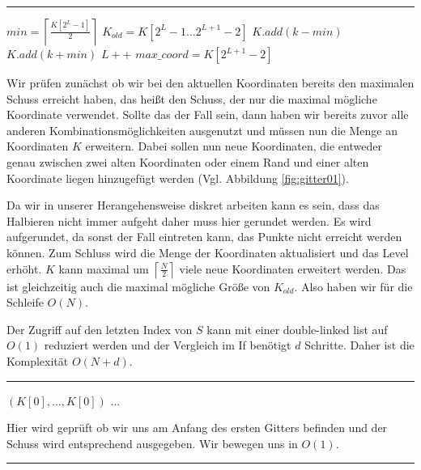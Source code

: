 \documentclass[a4paper,12pt]{llncs}
\numberwithin{equation}{section}
\begin{document}
\smallskip
\hrule
\smallskip
\begin{tcolorbox}
	\begin{algorithmic}
		\State $min=\left\lceil\frac{K[2^L-1]}{2}\right\rceil$
		\State $K_{old}=K\left[2^L-1\dots 2^{L+1}-2\right]$
		\State $K.add(k-min)$
		\State $K.add(k+min)$
		\EndFor
		\State $L++$
		\State $max\_coord=K\left[2^{L+1}-2\right]$
		\EndIf
	\end{algorithmic}
\end{tcolorbox}
Wir prüfen zunächst ob wir bei den aktuellen Koordinaten bereits den maximalen Schuss erreicht haben, das heißt den Schuss, der nur die maximal mögliche Koordinate verwendet. Sollte das der Fall sein, dann haben wir bereits zuvor alle anderen Kombinationsmöglichkeiten ausgenutzt und müssen nun die Menge an Koordinaten $K$ erweitern. Dabei sollen nun neue Koordinaten, die entweder genau zwischen zwei alten Koordinaten oder einem Rand und einer alten Koordinate liegen hinzugefügt werden (Vgl. Abbildung \ref{fig:gitter01}). 

Da wir in unserer Herangehensweise diskret arbeiten kann es sein, dass das Halbieren nicht immer aufgeht daher muss hier gerundet werden. Es wird aufgerundet, da sonst der Fall eintreten kann, das Punkte nicht erreicht werden können. Zum Schluss wird die Menge der Koordinaten aktualisiert und das Level erhöht. $K$ kann maximal um $\left\lceil\frac{N}{2}\right\rceil$ viele neue Koordinaten erweitert werden. Das ist gleichzeitig auch die maximal mögliche Größe von $K_{old}$. Also haben wir für die Schleife $O(N)$. 


Der Zugriff auf den letzten Index von $S$ kann mit einer double-linked list auf $O(1)$ reduziert werden und der Vergleich im If benötigt $d$ Schritte. Daher ist die Komplexität $O\left(N+d\right)$.

\smallskip
\hrule
\smallskip

\begin{tcolorbox}
	\begin{algorithmic}
		\If{$S=\emptyset$}
		\State \Return $(K[0],\dots,K[0])$
		\Else
		\State $\dots$
		\EndIf
	\end{algorithmic}
\end{tcolorbox}

Hier wird geprüft ob wir uns am Anfang des ersten Gitters befinden und der Schuss wird entsprechend ausgegeben. Wir bewegen uns in $O(1)$.

\smallskip
\hrule
\smallskip
\end{document}
